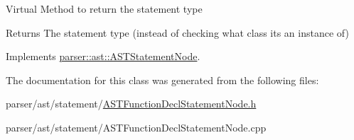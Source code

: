 Virtual Method to return the statement type \begin{DoxyReturn}{Returns}
The statement type (instead of checking what class it\textquotesingle{}s an instance of) 
\end{DoxyReturn}


Implements \hyperlink{classparser_1_1ast_1_1ASTStatementNode_ac381d35d12f774a1bab0e209c5bfec1f}{parser\+::ast\+::\+A\+S\+T\+Statement\+Node}.



The documentation for this class was generated from the following files\+:\begin{DoxyCompactItemize}
\item 
parser/ast/statement/\hyperlink{ASTFunctionDeclStatementNode_8h}{A\+S\+T\+Function\+Decl\+Statement\+Node.\+h}\item 
parser/ast/statement/A\+S\+T\+Function\+Decl\+Statement\+Node.\+cpp\end{DoxyCompactItemize}
